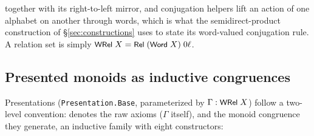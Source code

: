\noindent together with its right-to-left mirror, and conjugation
helpers lift an action of one alphabet on another through words, which
is what the semidirect-product construction of \S\ref{sec:constructions}
uses to state its word-valued conjugation rule.  A relation set is simply
$\mbox{\textsf{\small WRel}}\;X = \mbox{\textsf{\small Rel}}\;(\mbox{\textsf{\small Word}}\;X)\;0\ell$.

\subsection{Presented monoids as inductive congruences}\label{sec:presentations}

Presentations (\texttt{Presentation.Base}, parameterized by
$\Gamma : \mbox{\textsf{\small WRel}}\;X$) follow a two-level convention:
\aid{{\_}==={\_}} denotes the raw axioms ($\Gamma$ itself), and
 the monoid congruence they generate,
an inductive family with eight constructors:

